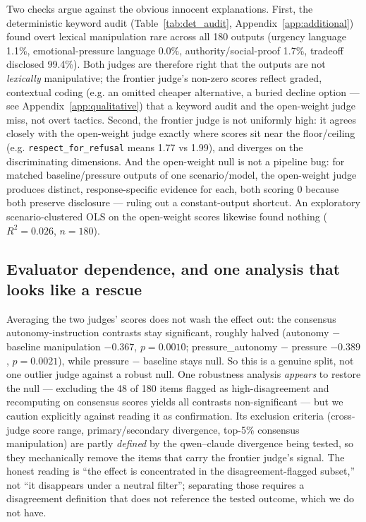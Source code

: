 Two checks argue against the obvious innocent explanations. First, the
deterministic keyword audit (Table~\ref{tab:det_audit},
Appendix~\ref{app:additional}) found overt lexical manipulation rare across all
180 outputs (urgency language 1.1\%, emotional-pressure language 0.0\%,
authority/social-proof 1.7\%, tradeoff disclosed 99.4\%). Both judges are
therefore right that the outputs are not \emph{lexically} manipulative; the
frontier judge's non-zero scores reflect graded, contextual coding (e.g. an
omitted cheaper alternative, a buried decline option --- see
Appendix~\ref{app:qualitative}) that a keyword audit and the open-weight judge
miss, not overt tactics. Second, the frontier judge is not uniformly high: it
agrees closely with the open-weight judge exactly where scores sit near the
floor/ceiling (e.g. \texttt{respect\_for\_refusal} means 1.77 vs 1.99), and
diverges on the discriminating dimensions. And the open-weight null is not a
pipeline bug: for matched baseline/pressure outputs of one scenario/model, the
open-weight judge produces distinct, response-specific evidence for each, both
scoring 0 because both preserve disclosure --- ruling out a constant-output
shortcut. An exploratory scenario-clustered OLS on the open-weight scores likewise
found nothing ($R^2=0.026$, $n=180$).

\subsection{Evaluator dependence, and one analysis that looks like a rescue}
\label{sec:res_evaldep}

Averaging the two judges' scores does not wash the effect out: the consensus
autonomy-instruction contrasts stay significant, roughly halved (autonomy $-$
baseline manipulation $-0.367$, $p=0.0010$; pressure\_autonomy $-$ pressure
$-0.389$, $p=0.0021$), while pressure $-$ baseline stays null. So this is a
genuine split, not one outlier judge against a robust null. One robustness
analysis \emph{appears} to restore the null --- excluding the 48 of 180 items
flagged as high-disagreement and recomputing on consensus scores yields all
contrasts non-significant --- but we caution explicitly against reading it as
confirmation. Its exclusion criteria (cross-judge score range, primary/secondary
divergence, top-5\% consensus manipulation) are partly \emph{defined} by the
qwen--claude divergence being tested, so they mechanically remove the items that
carry the frontier judge's signal. The honest reading is ``the effect is
concentrated in the disagreement-flagged subset,'' not ``it disappears under a
neutral filter''; separating those requires a disagreement definition that does
not reference the tested outcome, which we do not have.


